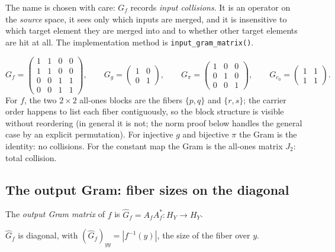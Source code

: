 The name is chosen with care: $G_f$ records \emph{input collisions}. It is an
operator on the \emph{source} space, it sees only which inputs are merged,
and it is insensitive to which target element they are merged into and to
whether other target elements are hit at all. The implementation method is
\texttt{input\_gram\_matrix()}.

\begin{example}\label{ch07:ex:gramquartet}
\[
G_f=\begin{pmatrix}1&1&0&0\\1&1&0&0\\0&0&1&1\\0&0&1&1\end{pmatrix},\qquad
G_g=\begin{pmatrix}1&0\\0&1\end{pmatrix},\qquad
G_\pi=\begin{pmatrix}1&0&0\\0&1&0\\0&0&1\end{pmatrix},\qquad
G_{c_0}=\begin{pmatrix}1&1\\1&1\end{pmatrix}.
\]
For $f$, the two $2\times 2$ all-ones blocks are the fibers $\{p,q\}$ and
$\{r,s\}$; the carrier order happens to list each fiber contiguously, so the
block structure is visible without reordering (in general it is not; the
norm proof below handles the general case by an explicit permutation). For
injective $g$ and bijective $\pi$ the Gram is the identity: no collisions.
For the constant map the Gram is the all-ones matrix $J_2$: total collision.
\end{example}

\subsection{The output Gram: fiber sizes on the diagonal}

\begin{definition}\label{ch07:def:outputgram}
The \emph{output Gram matrix} of $f$ is
$\widehat{G}_f = A_f A_f^* : H_Y\to H_Y$.
\end{definition}

\begin{proposition}\label{ch07:prop:outputgram}
$\widehat{G}_f$ is diagonal, with
$(\widehat{G}_f)_{yy}=|f^{-1}(y)|$, the size of the fiber over $y$.
\end{proposition}

